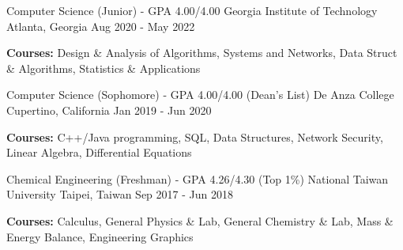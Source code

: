 

\begin{cventries}

  \cventry
    {Computer Science (Junior) - GPA 4.00/4.00 } %
    {Georgia Institute of Technology} %
    {Atlanta, Georgia} %
    {Aug 2020 - May 2022} %
   {
		\vspace{-5.0mm}
		\item {\textbf{Courses:} Design \& Analysis of Algorithms, Systems and Networks, Data Struct \& Algorithms, Statistics \& Applications} 
   }

  \cventry
    {Computer Science (Sophomore) - GPA 4.00/4.00 (Dean's List)} %
    {De Anza College} %
    {Cupertino, California} %
    {Jan 2019 - Jun 2020} %
   {
		\vspace{-5.0mm}
		\item {\textbf{Courses:} C++/Java programming, SQL, Data Structures, Network Security, Linear Algebra, Differential Equations}
   }

  \cventry
    {Chemical Engineering (Freshman) - GPA 4.26/4.30 (Top 1\%)} %
    {National Taiwan University} %
    {Taipei, Taiwan} %
    {Sep 2017 - Jun 2018} %
    {
		\vspace{-5.0mm}
		\item {\textbf{Courses:} Calculus, General Physics \& Lab, General Chemistry \& Lab, Mass \& Energy Balance, Engineering Graphics}
	}

\end{cventries}
